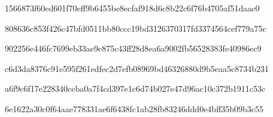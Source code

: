 \par\noindent\begin{minipage}{\linewidth}
\par
{\footnotesize\ttfamily 1566873f60ed601f70eff9b6455be8ecfaf918d6c8b22c6f76b4705af51daac0}\par
\end{minipage}\par\smallskip
\par\noindent\begin{minipage}{\linewidth}
\par
{\footnotesize\ttfamily 808636c853f426c47bfd0511bb80ccc19bd3126370317fd3374564cef779a75c}\par
\end{minipage}\par\smallskip
\par\noindent\begin{minipage}{\linewidth}
\par
{\footnotesize\ttfamily 902256e446fc7699eb33ae9e875c43ff28d8ea6a9002fb56528383fe40986ec9}\par
\end{minipage}\par\smallskip
\par\noindent\begin{minipage}{\linewidth}
\par
{\footnotesize\ttfamily c6d3da8376c91e595f261edfec2d7efb08969bd46326880d9b5eaa5c8734b231}\par
\end{minipage}\par\smallskip
\par\noindent\begin{minipage}{\linewidth}
\par
{\footnotesize\ttfamily a6f9c6f17e228340ceba0a7f4cd397e1c6d74b027e47d96ac10c372b1911c53c}\par
\end{minipage}\par\smallskip
\par\noindent\begin{minipage}{\linewidth}
\par
{\footnotesize\ttfamily 6e1622a30c0f64aae778331ae6f6438fc1ab28fb83246ddd0e4bff35b09b3c55}\par
\end{minipage}\par\smallskip
